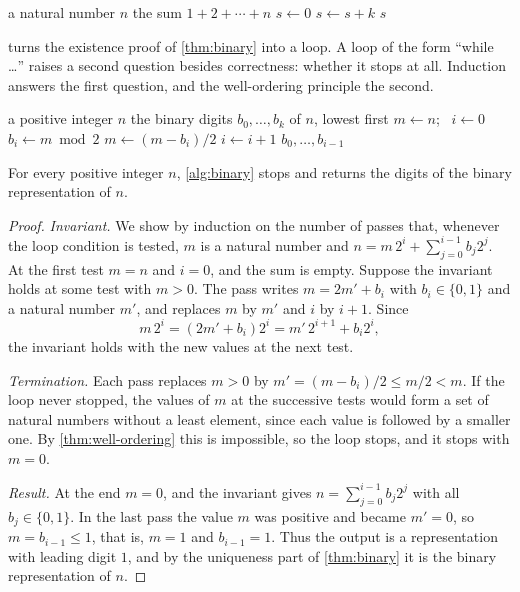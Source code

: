 \begin{algorithm}
\begin{algorithmic}[1]
\Require a natural number $n$
\Ensure the sum $1+2+\cdots+n$
\State $s\gets0$
 
  \State $s\gets s+k$
\EndFor
\State \Return $s$
\end{algorithmic}
\caption{Summation by a loop. The loop invariant proves that the result equals $n(n+1)/2$.}
\label{alg:sum}
\end{algorithm}

 turns the existence proof of \cref{thm:binary} into a loop. A loop of the form ``while \ldots'' raises a second question besides correctness: whether it stops at all. Induction answers the first question, and the well-ordering principle the second.

\begin{algorithm}
\begin{algorithmic}[1]
\Require a positive integer $n$
\Ensure the binary digits $b_0,\ldots,b_k$ of $n$, lowest first
\State $m\gets n$; \ $i\gets0$
 
  \State $b_i\gets m\bmod2$
  \State $m\gets(m-b_i)/2$
  \State $i\gets i+1$
\EndWhile
\State \Return $b_0,\ldots,b_{i-1}$
\end{algorithmic}
\caption{Binary digits by repeated halving.}
\label{alg:binary}
\end{algorithm}

\begin{proposition}
\label{prop:tobinary}
For every positive integer $n$, \cref{alg:binary} stops and returns the digits of the binary representation of $n$.
\end{proposition}

\begin{proof}
\emph{Invariant.} We show by induction on the number of passes that, whenever the loop condition is tested, $m$ is a natural number and $n=m\,2^i+\sum_{j=0}^{i-1}b_j2^j$. At the first test $m=n$ and $i=0$, and the sum is empty. Suppose the invariant holds at some test with $m>0$. The pass writes $m=2m'+b_i$ with $b_i\in\{0,1\}$ and a natural number $m'$, and replaces $m$ by $m'$ and $i$ by $i+1$. Since
\[
m\,2^i=(2m'+b_i)2^i=m'\,2^{i+1}+b_i2^i,
\]
the invariant holds with the new values at the next test.

\emph{Termination.} Each pass replaces $m>0$ by $m'=(m-b_i)/2\le m/2<m$. If the loop never stopped, the values of $m$ at the successive tests would form a set of natural numbers without a least element, since each value is followed by a smaller one. By \cref{thm:well-ordering} this is impossible, so the loop stops, and it stops with $m=0$.

\emph{Result.} At the end $m=0$, and the invariant gives $n=\sum_{j=0}^{i-1}b_j2^j$ with all $b_j\in\{0,1\}$. In the last pass the value $m$ was positive and became $m'=0$, so $m=b_{i-1}\le1$, that is, $m=1$ and $b_{i-1}=1$. Thus the output is a representation with leading digit $1$, and by the uniqueness part of \cref{thm:binary} it is the binary representation of $n$.
\end{proof}

